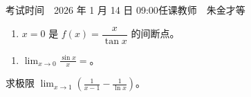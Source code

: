 \documentclass[UTF8,a4paper,zihao=-4,fontset=fandol]{ctexart}
\begin{document}
  {考试时间　2026 年 1 月 14 日 09:00}{任课教师　朱金才等}

\begin{enumerate}
  \item $x=0$ 是 $f(x)=\dfrac{x}{\tan x}$ 的\wefjnuoptionblank 间断点。
\end{enumerate}

\begin{enumerate}
  \item $\displaystyle\lim_{x\to0}\frac{\sin x}{x}=$\wefjnuanswerblank。
\end{enumerate}

求极限 $\displaystyle\lim_{x\to1}\left(\frac{1}{x-1}-\frac{1}{\ln x}\right)$。
\end{document}
